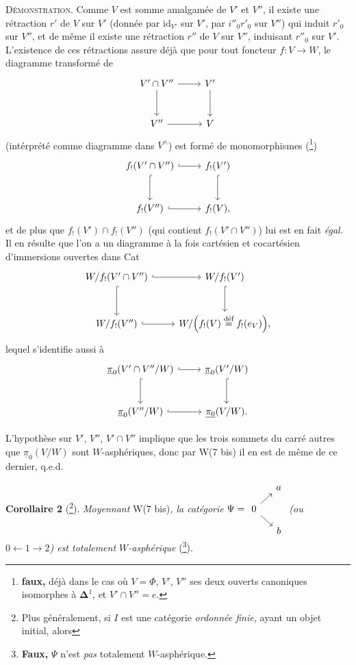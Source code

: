 \documentclass[11pt]{article}
\newcommand{\printedpage}[1]{\marginpar{\footnotesize p.~#1}}
\newcommand{\msp}[1]{\marginpar{\footnotesize [#1]}}
\newcommand{\upi}{\underline{\pi}}
\newcommand{\bDelta}{\boldsymbol{\Delta}}
\begin{document}
\textsc{Démonstration}. Comme $V$ est somme amalgamée de $V'$ et $V''$, il existe une rétraction $r'$ de $V$ sur $V'$ (donnée par $\mathrm{id}_{V'}$ sur $V'$, par $i''_0r'_0$ sur $V''$) qui induit $r'_0$ sur $V''$, et de même il existe
\msp{page 99}
une rétraction $r''$ de $V$ sur $V''$, induisant $r''_0$ sur $V'$. L'existence de ces rétractions assure déjà que pour tout foncteur $f : V \longrightarrow W$, le diagramme transformé de
\[
\begin{tikzcd}[row sep=large]
V'\cap V'' \arrow[r] \arrow[d] & V' \arrow[d] \\
V'' \arrow[r] & V
\end{tikzcd}
\]
(intérprété comme diagramme dans $V^\wedge$) est formé de monomorphismes (\footnote{\textbf{faux,} déjà dans le cas où $V = \Phi$, $V'$, $V''$ ses deux ouverts canoniques isomorphes à $\bDelta^1$, et $V'{\cap}V'' = e$.}) %
\[
\begin{tikzcd}[row sep=large]
f_!(V'\cap V'') \arrow[r, hook] \arrow[d, hook] & f_!(V') \arrow[d, hook] \\
f_!(V'') \arrow[r, hook] & f_!(V),
\end{tikzcd}
\]
et de plus que $f_!(V') \cap f_!(V'')$ (qui contient $f_!(V'\cap V'')$) lui est en fait \textit{égal.} Il en résulte que l'on a un diagramme à la fois cartésien et cocartésien d'immersions ouvertes dans Cat
\printedpage{70}
\[
\begin{tikzcd}[row sep=large]
W/f_!(V'\cap V'') \arrow[r, hook] \arrow[d, hook] & W/f_!(V') \arrow[d, hook] \\
W/f_!(V'') \arrow[r, hook] & W/\Bigl(f_!(V) \overset{\text{déf}}{=} f_!(e_V)\Bigr),
\end{tikzcd}
\]
lequel s'identifie aussi à
\[
\begin{tikzcd}[row sep=large]
\upi_0(V'\cap V''/W) \arrow[r, hook] \arrow[d, hook] & \upi_0(V'/W) \arrow[d, hook] \\
\upi_0(V''/W) \arrow[r, hook] & \underline{\pi_0}(V/W).
\end{tikzcd}
\]

\msp{page 100}
L'hypothèse sur $V'$, $V''$, $V'\cap V''$ implique que les trois sommets du carré autres que $\upi_0(V/W)$ sont $W$-asphériques, donc par W(7 bis) il en est de même de ce dernier, q.e.d.

\textbf{Corollaire 2} (\footnote{Plus généralement, si $I$ est une catégorie \textit{ordonnée finie,} ayant un objet initial, alors}). \textit{Moyennant} W(7 bis)\textit{, la catégorie} $\Psi = \begin{tikzcd}[ampersand replacement=\&, row sep=small, column sep=small, baseline=(B.base)]
 \& a \\
|[alias=B]| 0 \arrow[ur] \arrow[dr] \& \\
 \& b
\end{tikzcd}$ \textit{(ou $0 \longleftarrow 1 \longrightarrow 2$) est totalement $W$-asphérique} (\footnote{\textbf{Faux,} $\Psi$ n'est \textit{pas} totalement $W$-asphérique.}).
\end{document}
